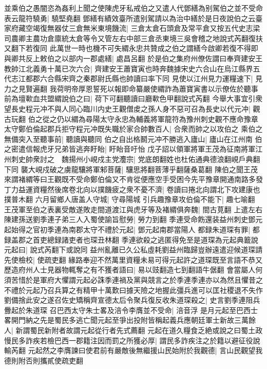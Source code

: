 並乘伯之愚闇恣為姦利上聞之使陳虎牙私戒伯之又遣人代鄧繕為别駕伯之並不受命表云龍符驍勇|{
	驍堅堯翻}
鄧繕有績效臺所遣别駕請以為治中繕於是日夜說伯之云臺家府藏空竭復無器仗三倉無米東境饑流|{
	三倉太倉石頭倉及常平倉又按五代史志梁司農卿主農功倉廪統太倉等令又管左右中部三倉丞東境三吳會稽之地說式芮翻復扶又翻下若復同}
此萬世一時也機不可失緭永忠共贊成之伯之謂繕今啟卿若復不得即與卿共反上敕伯之以部内一郡處繕|{
	處昌呂翻}
於是伯之集府州僚佐謂曰奉齊建安王教帥江北義勇十萬已次六合|{
	齊建安王蕭寶寅也時奔魏據宋史六合山在烏江縣界五代志江都郡六合縣宋齊之秦郡尉氏縣也帥讀曰率下同}
見使以江州見力運糧速下|{
	見力之見賢遍翻}
我荷明帝厚恩誓死以報即命纂嚴使緭詐為蕭寶寅書以示僚佐於聽事前為壇㰱血共盟緭說伯之曰|{
	荷下可翻聽讀曰廳㰱色甲翻說式芮翻}
今舉大事宜引衆望長史程元冲不與人同心臨川内史王觀僧䖍之孫人身不惡可召為長史以代元冲|{
	觀古玩翻}
伯之從之仍以緭為尋陽太守永忠為輔義將軍龍符為豫州刺史觀不應命豫章太守鄭伯倫起郡兵拒守程元冲既失職於家合帥數百人|{
	合衆而帥之以攻伯之}
乘伯之無備突入至聽事前|{
	聽讀與聽同}
伯之自出格鬭元冲不勝逃入廬山|{
	廬山在江州南}
伯之密遣信報虎牙兄弟皆逃奔盱眙|{
	盱眙音吁怡}
戊子詔以領軍將軍王茂為征南將軍江州刺史帥衆討之　魏揚州小峴戍主党灋宗|{
	党底朗翻姓也杜佑通典德浪翻峴戶典翻下同}
襲大峴戍破之虜龍驤將軍邾菩薩|{
	驤思將翻菩薄乎翻薩桑葛翻}
陳伯之聞王茂來謂褚緭等曰王觀既不受命鄭伯倫又不肯從便應空手受困今先平豫章開通南路多發丁力益運資糧然後席卷北向以撲饑疲之衆不憂不濟|{
	卷讀曰捲北向謂北下攻建康也撲普木翻}
六月留鄉人唐盖人守城|{
	守尋陽城}
引兵趣豫章攻伯倫不能下|{
	趣七喻翻}
王茂軍至伯之表裏受敵遂敗走間道渡江與虎牙等及褚緭俱奔魏|{
	間古莧翻}
上遣左右陳建孫送劉季連子弟三人入蜀使諭旨慰勞|{
	勞力到翻}
季連受命飭還装益州刺史鄧元起始得之官初季連為南郡太守不禮於元起|{
	鄧元起南郡當陽人}
都録朱道琛有罪|{
	都録盖郡之首吏總録諸吏者也琛丑林翻}
季連欲殺之逃匿得免至是道琛為元起典籖說元起曰|{
	說式芮翻下或說同}
益州亂離已久公私虛耗劉益州臨歸豈辦遠遣迎候道琛請先使檢校|{
	使疏吏翻}
緣路奉迎不然萬里資糧未易可得元起許之道琛既至言語不恭又歷造府州人士見器物輒奪之有不獲者語曰|{
	易以豉翻造七到翻語牛倨翻}
會當屬人何須苦惜於是軍府大懼謂元起必誅季連禍及黨與競言之於季連季連亦以為然且懼昔之不禮於元起乃召兵算之有精甲十萬歎曰據天險之地握此彊兵進可以匡社稷退不失作劉備捨此安之遂召佐史矯稱齊宣德太后令聚兵復反收朱道琛殺之|{
	史言劉季連阻兵釁起於朱道琛}
召巴西太守朱士畧及涪令李膺並不受命|{
	涪音浮}
是月元起至巴西士畧開門納之先是蜀民多逃亡聞元起至爭出投附皆稱起義兵應朝廷軍士新故三萬餘人|{
	新謂蜀民新附者故謂元起從行者先式薦翻}
元起在道久糧食乏絶或說之曰蜀土政慢民多詐疾若檢巴西一郡籍注因而罰之所獲必厚|{
	謂民多詐疾注之於籍以避征役說輸芮翻}
元起然之李膺諫曰使君前有嚴敵後無繼援山民始附於我觀德|{
	言山民觀望我德則附否則攜貳使疏吏翻}

